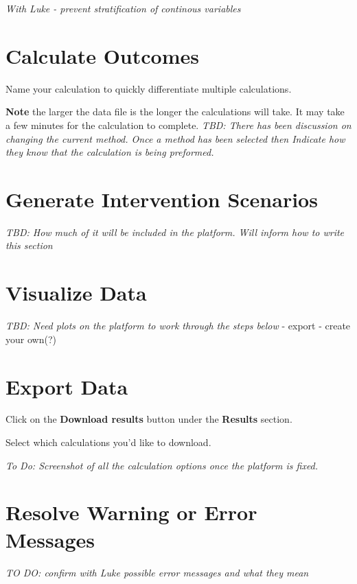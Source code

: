 \documentclass[]{book}
\begin{document}
\emph{With Luke - prevent stratification of continous variables}

\section{Calculate Outcomes}\label{calculate-outcomes}

Name your calculation to quickly differentiate multiple calculations.

\textbf{Note} the larger the data file is the longer the calculations
will take. It may take a few minutes for the calculation to complete.
\emph{TBD: There has been discussion on changing the current method.
Once a method has been selected then Indicate how they know that the
calculation is being preformed.}

\section{Generate Intervention
Scenarios}\label{generate-intervention-scenarios}

\emph{TBD: How much of it will be included in the platform. Will inform
how to write this section}

\section{Visualize Data}\label{visualize-data}

\emph{TBD: Need plots on the platform to work through the steps below} -
export - create your own(?)

\section{Export Data}\label{export-data}

Click on the \textbf{Download results} button under the \textbf{Results}
section.

Select which calculations you'd like to download.

\emph{To Do: Screenshot of all the calculation options once the platform
is fixed.}

\section{Resolve Warning or Error
Messages}\label{resolve-warning-or-error-messages}

\emph{TO DO: confirm with Luke possible error messages and what they
mean}
\end{document}
